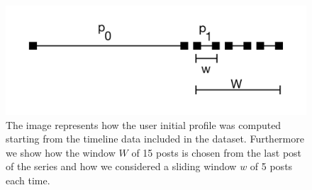 \begin{figure}[htb]
\centering
\includegraphics[scale=0.5]{figures/sliding_window.png}
\caption{The image represents how the user initial profile was computed starting from the timeline data included in the dataset. Furthermore we show how the window $W$ of 15 posts is chosen from the last post of the series and how we considered a sliding window $w$ of 5 posts each time.}
\label{fig:6}
\end{figure}

